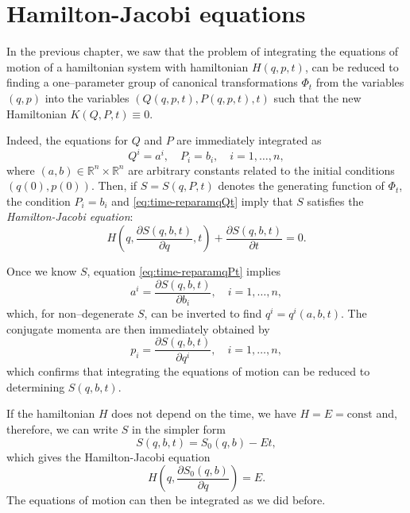 \documentclass[english,fontsize=11pt,paper=a5,oneside]{scrbook}
\newcommand{\R}{\mathbb{R}}
\theoremstyle{definition}
\begin{document}
\section{Hamilton-Jacobi equations}

In the previous chapter, we saw that the problem of integrating the equations of motion of a hamiltonian system with hamiltonian $H(q,p,t)$, can be reduced to finding a one--parameter group of canonical transformations $\Phi_t$ from the variables $(q,p)$ into the variables $(Q(q,p,t), P(q,p,t), t)$ such that the new Hamiltonian $K(Q,P,t) \equiv 0$.

Indeed, the equations for $Q$ and $P$ are immediately integrated as
\begin{equation}
    Q^i = a^i, \quad
    P_i = b_i, \quad
    i = 1,\ldots,n,
\end{equation}
where $(a,b)\in\R^{n}\times\R^n$ are arbitrary constants related to the initial conditions $(q(0), p(0))$.
Then, if $S = S(q,P,t)$ denotes the generating function of $\Phi_t$, the condition $P_i=b_i$ and \eqref{eq:time-reparamqQt} imply that $S$ satisfies the \emph{Hamilton-Jacobi equation}:
\begin{equation}\label{eq:Hamilton-Jacobi}
    H\left(q, \frac{\partial S(q,b,t)}{\partial q}, t\right) + \frac{\partial S(q,b,t)}{\partial t} = 0.
\end{equation}

Once we know $S$, equation \eqref{eq:time-reparamqPt} implies
\begin{equation}
    a^i = \frac{\partial S(q,b,t)}{\partial b_i}, \quad i =1,\ldots,n,
\end{equation}
which, for non--degenerate $S$, can be inverted to find $q^i = q^i(a,b,t)$.
The conjugate momenta are then immediately obtained by
\begin{equation}
    p_i = \frac{\partial S(q,b,t)}{\partial q^i}, \quad i =1,\ldots,n,
\end{equation}
which confirms that integrating the equations of motion can be reduced to determining $S(q,b,t)$.

If the hamiltonian $H$ does not depend on the time, we have $H=E=\mathrm{const}$ and, therefore, we can write $S$ in the simpler form
\begin{equation}
    S(q,b,t) = S_0(q,b) - E t,
\end{equation}
which gives the Hamilton-Jacobi equation
\begin{equation}\label{eq:HJnotime}
    H\left(q, \frac{\partial S_0(q,b)}{\partial q}\right) = E.
\end{equation}
The equations of motion can then be integrated as we did before.
\end{document}

